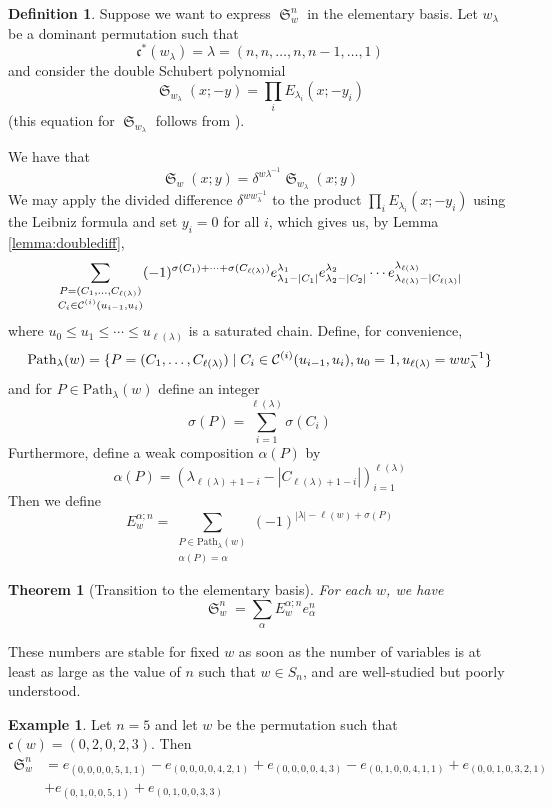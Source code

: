 \documentclass[a4paper,fleqn]{cas-sc}
\newtheorem{theorem}{Theorem}[section]
\theoremstyle{definition}
\newtheorem{definition}[lemma]{Definition}
\newtheorem{example}[lemma]{Example}
\theoremstyle{remark}
\numberwithin{equation}{subsection}
\DeclareMathOperator{\sch}{\mathfrak{S}}
\newcommand{\code}{\mathfrak{c}}
\begin{document}
\begin{definition}
Suppose we want to express $\sch_w^n$ in the elementary basis. Let $w_{\lambda}$ be a dominant permutation such that 
$$\code^*(w_\lambda)=\lambda = (n, n, \ldots, n, n - 1,\ldots, 1)$$ 
and consider the double Schubert polynomial
$$\sch_{w_{\lambda}}(x;-y)=\prod_i E_{\lambda_i}(x;-y_i)$$
(this equation for $\sch_{w_\lambda}$ follows from \cite[(6.14)]{notes}).


We have that
$$\sch_w(x;y) = \delta^{w\lambda^{-1}}\sch_{w_{\lambda}}(x;y)$$
We may apply the divided difference $\delta^{ww_\lambda^{-1}}$ to the product $\prod_i E_{\lambda_i}(x;-y_i)$ using the Leibniz formula and set $y_i=0$ for all $i$, which gives us, by Lemma \ref{lemma:doublediff},
$$\sum_{\substack{P=(C_1,\ldots,C_{\ell(\lambda)})\\ C_i\in\mathcal{C}^{(i)}(u_{i-1},u_i)}}(-1)^{\sigma(C_1)+\cdots+\sigma(C_{\ell(\lambda)})}e_{\lambda_{1}-|C_1|}^{\lambda_1}e_{\lambda_2-|C_2|}^{\lambda_2}\cdots e_{\lambda_{\ell(\lambda)}-|C_{\ell(\lambda)}|}^{\lambda_{\ell(\lambda)}}$$
where $u_0 \leq u_1\leq \cdots \leq u_{\ell(\lambda)}$ is a saturated chain.
Define, for convenience,
$$\mathrm{Path}_\lambda(w) = \{P=(C_1,\ldots,C_{\ell(\lambda)})\mid C_i\in\mathcal{C}^{(i)}(u_{i-1},u_i),u_0=1,u_{\ell(\lambda)}=ww_\lambda^{-1}\}$$
and for $P\in\mathrm{Path}_\lambda(w)$ define an integer
$$\sigma(P) = \sum_{i=1}^{\ell(\lambda)} \sigma(C_i)$$
Furthermore, define a weak composition $\alpha(P)$ by
$$\alpha(P) = (\lambda_{\ell(\lambda) + 1 - i}-|C_{\ell(\lambda) + 1 - i}|)_{i=1}^{\ell(\lambda)}$$
Then we define
$$E^{\alpha;n}_w = \sum_{\substack{P \in \mathrm{Path}_\lambda(w)\\ \alpha(P)=\alpha}}(-1)^{|\lambda|-\ell(w)+\sigma(P)}$$
\end{definition}

\begin{theorem}[Transition to the elementary basis] \label{theorem:elemtrans}
	For each $w$, we have
	$$\sch_w^n = \sum_{\alpha}E_w^{\alpha;n}e_{\alpha}^n$$
\end{theorem}
These numbers are stable for fixed $w$ as soon as the number of variables is at least as large as the value of $n$ such that $w\in S_n$, and are well-studied but poorly understood.

\begin{example}
	Let $n=5$ and let $w$ be the permutation such that $\code(w)=(0,2,0,2,3)$. Then
	\begin{align*}
		\sch_w^n &= e_{(0,0,0,0,5,1,1)} - e_{(0,0,0,0,4,2,1)} + e_{(0,0,0,0,4,3)}- e_{(0,1,0,0,4,1,1)} +e_{(0,0,1,0,3,2,1)}\\
		&+e_{(0,1,0,0,5,1)} + e_{(0,1,0,0,3,3)}
	\end{align*}
\end{example}
\end{document}
